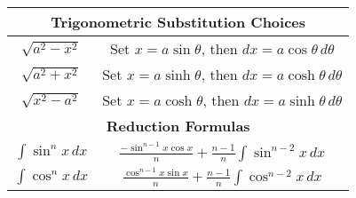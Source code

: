 \begin{table}[h]
\begin{tabular}{|c|c|}
        \hline
        \multicolumn{2}{|c|}{\textbf{Trigonometric Substitution Choices}} \\
        \hline
        $\sqrt{a^2 - x^2}$ & Set $x = a \sin \theta$, then $dx = a \cos \theta \, d\theta$ \\
        $\sqrt{a^2 + x^2}$ & Set $x = a \sinh \theta$, then $dx = a \cosh \theta \, d\theta$ \\
        $\sqrt{x^2 - a^2}$ & Set $x = a \cosh \theta$, then $dx = a \sinh \theta \, d\theta$ \\
        \hline
        \multicolumn{2}{|c|}{\textbf{Reduction Formulas}} \\
        \hline
        $\int \sin^n x \,dx$ & $\frac{-\sin^{n-1} x \cos x}{n} + \frac{n-1}{n} \int \sin^{n-2} x \,dx$ \\
        $\int \cos^n x \,dx$ & $\frac{\cos^{n-1} x \sin x}{n} + \frac{n-1}{n} \int \cos^{n-2} x \,dx$ \\
        \hline
    \end{tabular}
    \label{tab:integrals}
\end{table}
